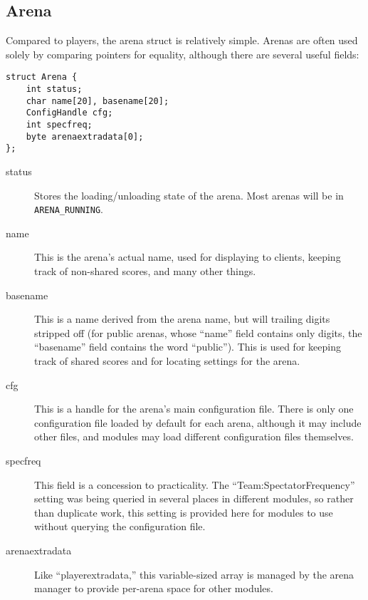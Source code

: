 \documentclass{article}
\begin{document}
\subsection{Arena}

Compared to players, the arena struct is relatively simple. Arenas are
often used solely by comparing pointers for equality, although there are
several useful fields:

\begin{verbatim}
struct Arena {
    int status;
    char name[20], basename[20];
    ConfigHandle cfg;
    int specfreq;
    byte arenaextradata[0];
};
\end{verbatim}

\begin{description}

\item[status] Stores the loading/unloading state of the arena. Most
arenas will be in \verb/ARENA_RUNNING/.

\item[name] This is the arena's actual name, used for displaying to
clients, keeping track of non-shared scores, and many other things.

\item[basename] This is a name derived from the arena name, but will
trailing digits stripped off (for public arenas, whose ``name'' field
contains only digits, the ``basename'' field contains the word
``public''). This is used for keeping track of shared scores and for
locating settings for the arena.

\item[cfg] This is a handle for the arena's main configuration file.
There is only one configuration file loaded by default for each arena,
although it may include other files, and modules may load different
configuration files themselves.

\item[specfreq] This field is a concession to practicality. The
``Team:SpectatorFrequency'' setting was being queried in several places
in different modules, so rather than duplicate work, this setting is
provided here for modules to use without querying the configuration
file.

\item[arenaextradata] Like ``playerextradata,'' this variable-sized
array is managed by the arena manager to provide per-arena space for
other modules.

\end{description}
\end{document}
